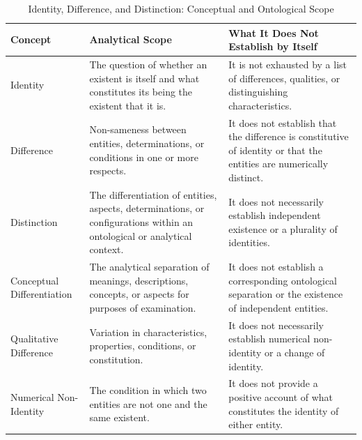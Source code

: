 %
%
%
%
%

\begin{table}[htbp]
\centering
\small
\caption{Identity, Difference, and Distinction: Conceptual and Ontological Scope}
\label{tab:identity-difference-distinction-matrix}

\begin{tabular}{|p{}|p{}|p{}|}
\hline
\textbf{Concept}
&
\textbf{Analytical Scope}
&
\textbf{What It Does Not Establish by Itself}
\\
\hline

Identity
&
The question of whether an existent is itself and what constitutes its being the existent that it is.
&
It is not exhausted by a list of differences, qualities, or distinguishing characteristics.
\\
\hline

Difference
&
Non-sameness between entities, determinations, or conditions in one or more respects.
&
It does not establish that the difference is constitutive of identity or that the entities are numerically distinct.
\\
\hline

Distinction
&
The differentiation of entities, aspects, determinations, or configurations within an ontological or analytical context.
&
It does not necessarily establish independent existence or a plurality of identities.
\\
\hline

Conceptual Differentiation
&
The analytical separation of meanings, descriptions, concepts, or aspects for purposes of examination.
&
It does not establish a corresponding ontological separation or the existence of independent entities.
\\
\hline

Qualitative Difference
&
Variation in characteristics, properties, conditions, or constitution.
&
It does not necessarily establish numerical non-identity or a change of identity.
\\
\hline

Numerical Non-Identity
&
The condition in which two entities are not one and the same existent.
&
It does not provide a positive account of what constitutes the identity of either entity.
\\
\hline

\end{tabular}
\end{table}

